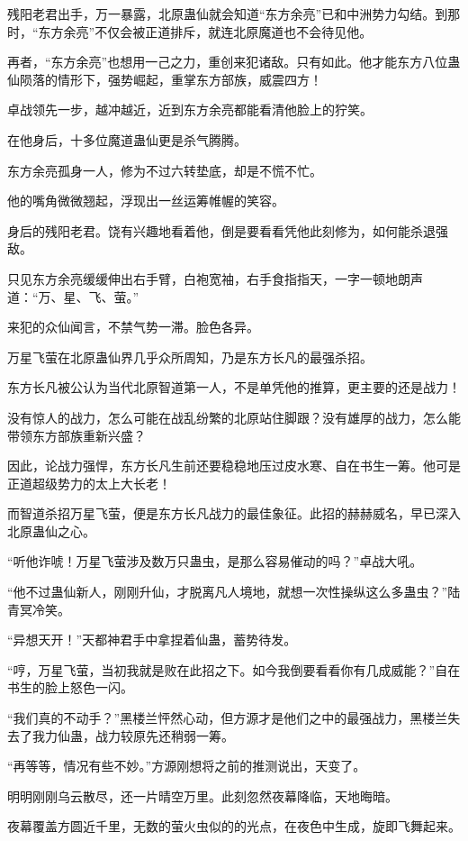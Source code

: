 \begin{this_body}
残阳老君出手，万一暴露，北原蛊仙就会知道“东方余亮”已和中洲势力勾结。到那时，“东方余亮”不仅会被正道排斥，就连北原魔道也不会待见他。

再者，“东方余亮”也想用一己之力，重创来犯诸敌。只有如此。他才能东方八位蛊仙陨落的情形下，强势崛起，重掌东方部族，威震四方！

卓战领先一步，越冲越近，近到东方余亮都能看清他脸上的狞笑。

在他身后，十多位魔道蛊仙更是杀气腾腾。

东方余亮孤身一人，修为不过六转垫底，却是不慌不忙。

他的嘴角微微翘起，浮现出一丝运筹帷幄的笑容。

身后的残阳老君。饶有兴趣地看着他，倒是要看看凭他此刻修为，如何能杀退强敌。

只见东方余亮缓缓伸出右手臂，白袍宽袖，右手食指指天，一字一顿地朗声道：“万、星、飞、萤。”

来犯的众仙闻言，不禁气势一滞。脸色各异。

万星飞萤在北原蛊仙界几乎众所周知，乃是东方长凡的最强杀招。

东方长凡被公认为当代北原智道第一人，不是单凭他的推算，更主要的还是战力！

没有惊人的战力，怎么可能在战乱纷繁的北原站住脚跟？没有雄厚的战力，怎么能带领东方部族重新兴盛？

因此，论战力强悍，东方长凡生前还要稳稳地压过皮水寒、自在书生一筹。他可是正道超级势力的太上大长老！

而智道杀招万星飞萤，便是东方长凡战力的最佳象征。此招的赫赫威名，早已深入北原蛊仙之心。

“听他诈唬！万星飞萤涉及数万只蛊虫，是那么容易催动的吗？”卓战大吼。

“他不过蛊仙新人，刚刚升仙，才脱离凡人境地，就想一次性操纵这么多蛊虫？”陆青冥冷笑。

“异想天开！”天都神君手中拿捏着仙蛊，蓄势待发。

“哼，万星飞萤，当初我就是败在此招之下。如今我倒要看看你有几成威能？”自在书生的脸上怒色一闪。

“我们真的不动手？”黑楼兰怦然心动，但方源才是他们之中的最强战力，黑楼兰失去了我力仙蛊，战力较原先还稍弱一筹。

“再等等，情况有些不妙。”方源刚想将之前的推测说出，天变了。

明明刚刚乌云散尽，还一片晴空万里。此刻忽然夜幕降临，天地晦暗。

夜幕覆盖方圆近千里，无数的萤火虫似的的光点，在夜色中生成，旋即飞舞起来。


\end{this_body}
